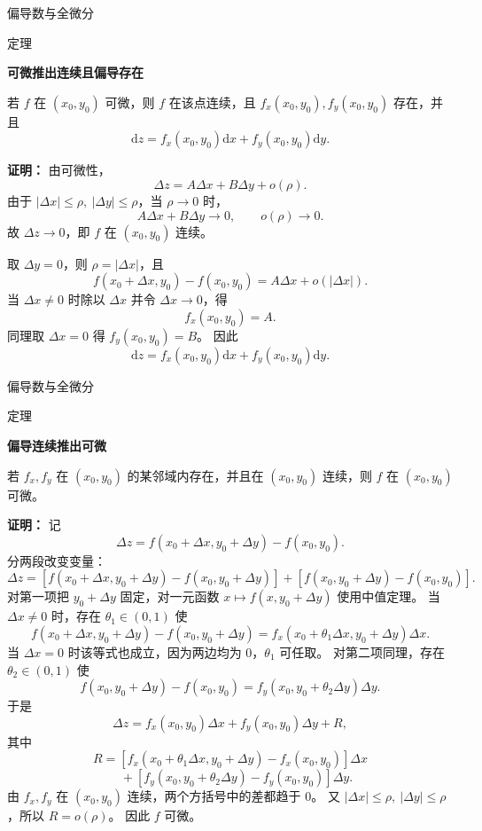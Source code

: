 \documentclass[aspectratio=169,10pt,fontset=fandol]{ctexbeamer}
\newcommand{\dd}{\mathrm{d}}
\begin{document}
\begin{frame}[t,fragile]{偏导数与全微分}
\footnotesize
\begin{block}{定理}
{\footnotesize
\textbf{可微推出连续且偏导存在}\par

若 $f$ 在 $(x_0,y_0)$ 可微，则 $f$ 在该点连续，且 $f_x(x_0,y_0),f_y(x_0,y_0)$ 存在，并且
\[
\dd z=f_x(x_0,y_0)\dd x+f_y(x_0,y_0)\dd y.
\]

}
\end{block}
\pause
{\footnotesize
\textbf{证明：}
由可微性，
\[
\Delta z=A\Delta x+B\Delta y+o(\rho).
\]
由于 $|\Delta x|\leq\rho,\ |\Delta y|\leq\rho$，当 $\rho\to0$ 时，
\[
A\Delta x+B\Delta y\to0,\qquad o(\rho)\to0.
\]
故 $\Delta z\to0$，即 $f$ 在 $(x_0,y_0)$ 连续。

取 $\Delta y=0$，则 $\rho=|\Delta x|$，且
\[
f(x_0+\Delta x,y_0)-f(x_0,y_0)=A\Delta x+o(|\Delta x|).
\]
当 $\Delta x\neq0$ 时除以 $\Delta x$ 并令 $\Delta x\to0$，得
\[
f_x(x_0,y_0)=A.
\]
同理取 $\Delta x=0$ 得 $f_y(x_0,y_0)=B$。 因此
\[
\dd z=f_x(x_0,y_0)\dd x+f_y(x_0,y_0)\dd y.
\]

}
\end{frame}
\begin{frame}[t,fragile]{偏导数与全微分}
\footnotesize
\begin{block}{定理}
{\footnotesize
\textbf{偏导连续推出可微}\par

若 $f_x,f_y$ 在 $(x_0,y_0)$ 的某邻域内存在，并且在 $(x_0,y_0)$ 连续，则 $f$ 在 $(x_0,y_0)$ 可微。

}
\end{block}
\pause
{\footnotesize
\textbf{证明：}
记
\[
\Delta z=f(x_0+\Delta x,y_0+\Delta y)-f(x_0,y_0).
\]
分两段改变变量：
\[
\Delta z=[f(x_0+\Delta x,y_0+\Delta y)-f(x_0,y_0+\Delta y)]
+[f(x_0,y_0+\Delta y)-f(x_0,y_0)].
\]
对第一项把 $y_0+\Delta y$ 固定，对一元函数 $x\mapsto f(x,y_0+\Delta y)$ 使用中值定理。 当 $\Delta x\neq0$ 时，存在 $\theta_1\in(0,1)$ 使
\[
f(x_0+\Delta x,y_0+\Delta y)-f(x_0,y_0+\Delta y)
=f_x(x_0+\theta_1\Delta x,y_0+\Delta y)\Delta x.
\]
当 $\Delta x=0$ 时该等式也成立，因为两边均为 $0$，$\theta_1$ 可任取。 对第二项同理，存在 $\theta_2\in(0,1)$ 使
\[
f(x_0,y_0+\Delta y)-f(x_0,y_0)
=f_y(x_0,y_0+\theta_2\Delta y)\Delta y.
\]
于是
\[
\Delta z=f_x(x_0,y_0)\Delta x+f_y(x_0,y_0)\Delta y+R,
\]
其中
\[
R=[f_x(x_0+\theta_1\Delta x,y_0+\Delta y)-f_x(x_0,y_0)]\Delta x
\]
\[
\quad+[f_y(x_0,y_0+\theta_2\Delta y)-f_y(x_0,y_0)]\Delta y.
\]
由 $f_x,f_y$ 在 $(x_0,y_0)$ 连续，两个方括号中的差都趋于 $0$。 又 $|\Delta x|\leq\rho,\ |\Delta y|\leq\rho$，所以 $R=o(\rho)$。 因此 $f$ 可微。

}
\end{frame}
\end{document}
